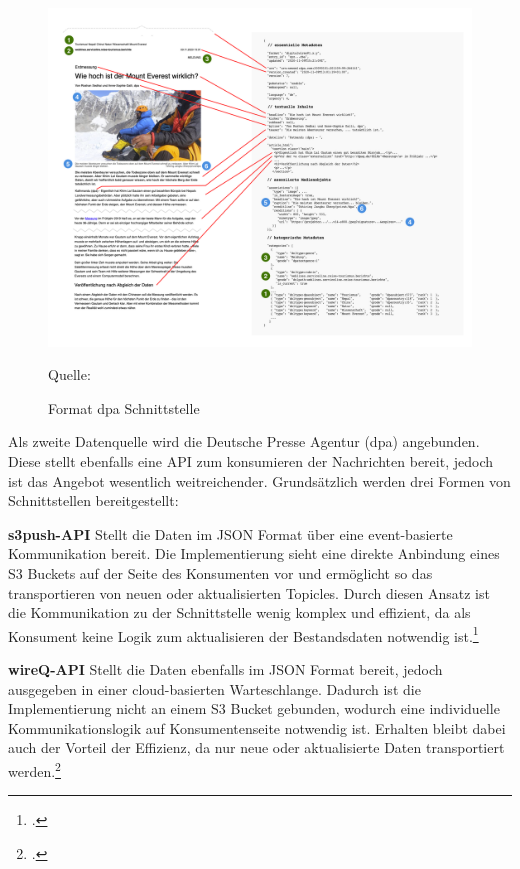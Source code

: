 \newpage
\begin{figure}
    \centering
    \includegraphics[width=1\linewidth]{abbildungen/dpa doc structure.png}
    \caption{Format dpa Schnittstelle}
    \label{fig:Format dpa Schnittstelle}
    Quelle: 
\end{figure}
Als zweite Datenquelle wird die Deutsche Presse Agentur (dpa) angebunden. 
Diese stellt ebenfalls eine API zum konsumieren der Nachrichten bereit, jedoch ist das Angebot wesentlich weitreichender. Grundsätzlich werden drei Formen von Schnittstellen bereitgestellt:

\textbf{s3push-API}
Stellt die Daten im JSON Format über eine event-basierte Kommunikation bereit. Die Implementierung sieht eine direkte Anbindung eines S3 Buckets auf der Seite des Konsumenten vor und ermöglicht so das transportieren von neuen oder aktualisierten Topicles. Durch diesen Ansatz ist die Kommunikation zu der Schnittstelle wenig komplex und effizient, da als Konsument keine Logik zum aktualisieren der Bestandsdaten notwendig ist.\footcite[Vgl.][]{DpaApiDocumentation.APIs.2024}

\textbf{wireQ-API}
Stellt die Daten ebenfalls im JSON Format bereit, jedoch ausgegeben in einer cloud-basierten Warteschlange. Dadurch ist die Implementierung nicht an einem S3 Bucket gebunden, wodurch eine individuelle Kommunikationslogik auf Konsumentenseite notwendig ist. Erhalten bleibt dabei auch der Vorteil der Effizienz, da nur neue oder aktualisierte Daten transportiert werden.\footcite[Vgl.][]{DpaApiDocumentation.APIs.2024}

